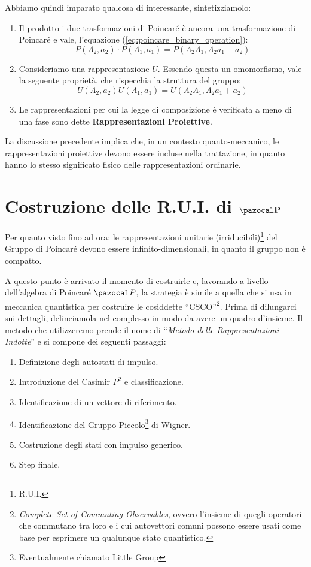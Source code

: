 \documentclass[../main.tex]{subfiles}
\begin{document}
Abbiamo quindi imparato qualcosa di interessante, sintetizziamolo:
\begin{enumerate}
    \item[\textbf{i)}] Il prodotto i due trasformazioni di Poincaré è ancora una trasformazione di Poincaré e vale, l'equazione (\ref{eq:poincare_binary_operation}):
    \[
    P(\Lambda_2, a_2)\cdot P(\Lambda_1, a_1) = P(\Lambda_2\Lambda_1,\Lambda_2 a_1 +  a_2)
    \]
    \item[\textbf{ii)}] Consideriamo una rappresentazione $U$. Essendo questa un omomorfismo, vale la seguente proprietà, che rispecchia la struttura del gruppo:
    \[
     U(\Lambda_2,a_2)U(\Lambda_1,a_1) = U(\Lambda_2\Lambda_1,\Lambda_2 a_1 +  a_2)
    \]
    \item[\textbf{iii)}] Le rappresentazioni per cui la legge di composizione è verificata a meno di una fase sono dette \textbf{Rappresentazioni Proiettive}.
\end{enumerate}

La discussione precedente implica che, in un contesto quanto-meccanico, le rappresentazioni proiettive devono essere incluse nella trattazione, in quanto hanno lo stesso significato fisico delle rappresentazioni ordinarie.

\section{Costruzione delle R.U.I. di $\mathbf{\pazocal P}$}

Per quanto visto fino ad ora: le rappresentazioni unitarie (irriducibili)\footnote{R.U.I.} del Gruppo di Poincaré devono essere infinito-dimensionali, in quanto il gruppo non è compatto.

A questo punto è arrivato il momento di costruirle e, lavorando a livello dell'algebra di Poincaré $\pazocal P$, la strategia è simile a quella che si usa in meccanica quantistica per costruire le cosiddette “CSCO”\footnote{\textit{Complete Set of Commuting Observables}, ovvero l'insieme di quegli operatori che commutano tra loro e i cui autovettori comuni possono essere usati come base per esprimere un qualunque stato quantistico.}. Prima di dilungarci sui dettagli, delineiamola nel complesso in modo da avere un quadro d'insieme. Il metodo che utilizzeremo prende il nome di “\textit{Metodo delle Rappresentazioni Indotte}” e si compone dei seguenti passaggi:
\begin{enumerate}
    \item[\textbf{STEP 1.}] Definizione degli autostati di impulso.
    \item[\textbf{STEP 2.}] Introduzione del Casimir $P^2$ e classificazione.
    \item[\textbf{STEP 3.}] Identificazione di un vettore di riferimento.
    \item[\textbf{STEP 4.}] Identificazione del Gruppo Piccolo\footnote{Eventualmente chiamato Little Group} di Wigner.
    \item[\textbf{STEP 5.}] Costruzione degli stati con impulso generico.
    \item[\textbf{STEP 6.}] Step finale. 
\end{enumerate}
\end{document}
